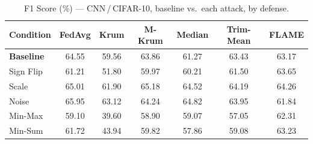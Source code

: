 \begin{table}[t]
\centering
\caption{F1 Score (\%) --- CNN\,/\,CIFAR-10, baseline vs.\ each attack, by defense.}
\label{tab:cnn_f1}
\footnotesize
\begin{tabular}{lcccccc}
\toprule
Condition & FedAvg & Krum & M-Krum & Median & Trim-Mean & FLAME \\
\midrule
\textbf{Baseline} & 64.55 & 59.56 & 63.86 & 61.27 & 63.43 & 63.17 \\
\midrule
Sign Flip & 61.21 & 51.80 & 59.97 & 60.21 & 61.50 & 63.65 \\
Scale & 65.01 & 61.90 & 65.18 & 64.52 & 64.19 & 64.26 \\
Noise & 65.95 & 63.12 & 64.24 & 64.82 & 63.95 & 61.84 \\
Min-Max & 59.10 & 39.60 & 58.90 & 59.07 & 57.05 & 62.31 \\
Min-Sum & 61.72 & 43.94 & 59.82 & 57.86 & 59.08 & 63.23 \\
\bottomrule
\end{tabular}
\end{table}
